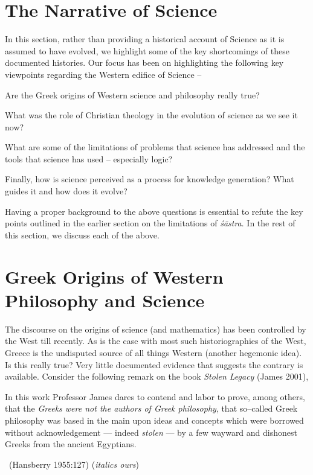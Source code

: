 \section*{The Narrative of Science }

In this section, rather than providing a historical account of Science as it is assumed to have evolved, we highlight some of the key shortcomings of these documented histories. Our focus has been on highlighting the following key viewpoints regarding the Western edifice of Science –

\item Are the Greek origins of Western science and philosophy really true?

 \item What was the role of Christian theology in the evolution of science as we see it now?

 \item What are some of the limitations of problems that science has addressed and the tools that science has used – especially logic?

 \item Finally, how is science perceived as a process for knowledge generation? What guides it and how does it evolve?

Having a proper background to the above questions is essential to refute the key points outlined in the earlier section on the limitations of \textit{śāstra}. In the rest of this section, we discuss each of the above.


\section*{Greek Origins of Western Philosophy and Science}

The discourse on the origins of science (and mathematics) has been controlled by the West till recently. As is the case with most such historiographies of the West, Greece is the undisputed source of all things Western (another hegemonic idea). Is this really true? Very little documented evidence that suggests the contrary is available. Consider the following remark on the book \textit{Stolen Legacy} (James 2001),

\begin{myquote}
In this work Professor James dares to contend and labor to prove, among others, that the \textit{Greeks were not the authors of Greek philosophy}, that so–called Greek philosophy was based in the main upon ideas and concepts which were borrowed without acknowledgement — indeed \textit{stolen} — by a few wayward and dishonest Greeks from the ancient Egyptians. 

~\hfill (Hansberry 1955:127) (\textit{italics ours})
\end{myquote}

